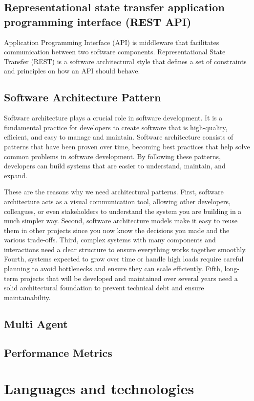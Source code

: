     \subsection{Representational state transfer application programming interface (REST API)}
    Application Programming Interface (API) is middleware that facilitates communication between two software components. Representational State Transfer (REST) is a software architectural style that defines a set of constraints and principles on how an API should behave.
    \subsection{Software Architecture Pattern}
    Software architecture plays a crucial role in software development. It is a fundamental practice for developers to create software that is high-quality, efficient, and easy to manage and maintain. Software architecture consists of patterns that have been proven over time, becoming best practices that help solve common problems in software development. By following these patterns, developers can build systems that are easier to understand, maintain, and expand.
    
    These are the reasons why we need architectural patterns. First, software architecture acts as a visual communication tool, allowing other developers, colleagues, or even stakeholders to understand the system you are building in a much simpler way. Second, software architecture models make it easy to reuse them in other projects since you now know the decisions you made and the various trade-offs. Third, complex systems with many components and interactions need a clear structure to ensure everything works together smoothly. Fourth, systems expected to grow over time or handle high loads require careful planning to avoid bottlenecks and ensure they can scale efficiently. Fifth, long-term projects that will be developed and maintained over several years need a solid architectural foundation to prevent technical debt and ensure maintainability.
    \subsection{Multi Agent}
    \subsection{Performance Metrics}
\section{Languages and technologies}

